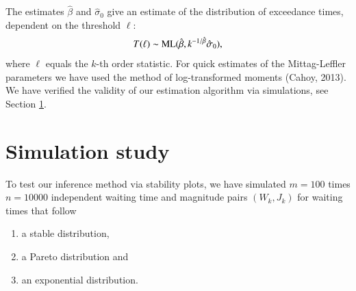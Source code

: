 \documentclass[]{elsarticle} %
\begin{document}
The estimates \(\hat \beta\) and \(\hat \sigma_0\) give an estimate of
the distribution of exceedance times, dependent on the threshold
\(\ell\): \begin{align*}
T(\ell) \sim {\rm ML}(\hat \beta, k^{-1/\hat \beta} \hat \sigma_0),
\end{align*} where \(\ell\) equals the \(k\)-th order statistic. For
quick estimates of the Mittag-Leffler parameters we have used the method
of log-transformed moments (Cahoy, 2013). We have verified the validity
of our estimation algorithm via simulations, see Section
\ref{Simulationstudy}.

\hypertarget{Simulationstudy}{%
\section{Simulation study}\label{Simulationstudy}}

To test our inference method via stability plots, we have simulated
\(m=100\) times \(n=10000\) independent waiting time and magnitude pairs
\((W_k, J_k)\) for waiting times that follow

\begin{enumerate}
\def\labelenumi{(\roman{enumi})}
\item
  a stable distribution,
\item
  a Pareto distribution and
\item
  an exponential distribution.
\end{enumerate}
\end{document}
